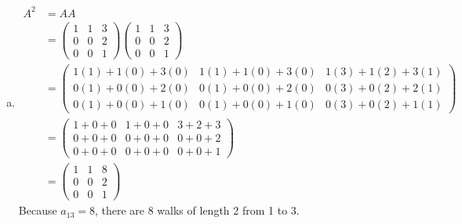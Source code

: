 \documentclass[12pt,letterpaper]{exam}
\begin{document}
\begin{questions}
\begin{enumerate}[(a)]
\item 
	\[
	\begin{aligned}
	A^2&= AA \\[0.3cm]
	&= \begin{pmatrix}
	1 & 1 & 3 \\
	0 & 0 & 2 \\
	0 & 0 & 1
	\end{pmatrix}
	\begin{pmatrix}
	1 & 1 & 3 \\
	0 & 0 & 2 \\
	0 & 0 & 1
	\end{pmatrix} \\[0.3cm]
	&= \begin{pmatrix}
	1(1) + 1(0) + 3(0) & 1(1) + 1(0) + 3(0) & 1(3) + 1(2) + 3(1) \\
	0(1) + 0(0) + 2(0) & 0(1) + 0(0) + 2(0) & 0(3) + 0(2) + 2(1)  \\
	0(1) + 0(0) + 1(0) & 0(1) + 0(0) + 1(0) & 0(3) + 0(2) + 1(1) 
	\end{pmatrix} \\[0.3cm]
	&= \begin{pmatrix}
	1 + 0 + 0 & 1 + 0 + 0 & 3 + 2 + 3 \\
	0 + 0 + 0 & 0 + 0 + 0 & 0 + 0 + 2 \\
	0 + 0 + 0 & 0 + 0 + 0 & 0 + 0 + 1 
	\end{pmatrix} \\[0.3cm]
	&= \begin{pmatrix}
	1 & 1 & 8 \\
	0 & 0 & 2 \\
	0 & 0 & 1
	\end{pmatrix}
	\end{aligned}
	\]
Because $a_{13}= 8$, there are 8 walks of length 2 from 1 to 3. 
\end{enumerate}


\end{questions}
\end{document}
